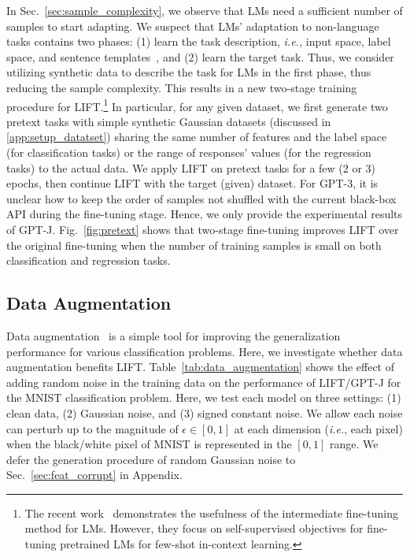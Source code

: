 In Sec.~\ref{sec:sample_complexity}, we observe that LMs need a sufficient number of samples to start adapting. We suspect that LMs' adaptation to non-language tasks contains two phases: (1) learn the task description, \textit{i.e.,} input space, label space, and sentence templates~\citep{reynolds2021prompt,min2022rethinking}, and (2) learn the target task. Thus, we consider utilizing synthetic data to describe the task for LMs in the first phase, thus reducing the sample complexity. This results in a new two-stage training procedure for \textsc{LIFT}.\footnote{The recent work~\citep{chen2022improving} demonstrates the usefulness of the intermediate fine-tuning method for LMs. However, they focus on self-supervised objectives for fine-tuning pretrained LMs for few-shot in-context learning.} In particular, for any given dataset, we first generate two pretext tasks with simple synthetic Gaussian datasets (discussed in \ref{app:setup_datatset}) sharing the same number of features and the label space (for classification tasks) or the range of responses' values (for the regression tasks) to the actual data. We apply \textsc{LIFT} on pretext tasks for a few (2 or 3) epochs, then continue \textsc{LIFT} with the target (given) dataset. For GPT-3, it is unclear how to keep the order of samples not shuffled with the current black-box API during the fine-tuning stage. Hence, we only provide the experimental results of GPT-J.
Fig.~\ref{fig:pretext} shows that two-stage  fine-tuning improves \textsc{LIFT} over the original fine-tuning when the number of training samples is small on both classification and regression tasks. 

\subsection{Data Augmentation}
\label{sec:improve_augmentation}

Data augmentation~\citep{shorten2019survey} is a simple tool for improving the generalization performance for various classification problems. Here, we investigate whether data augmentation benefits \textsc{LIFT}. Table~\ref{tab:data_augmentation} shows the effect of adding random noise in the training data on the performance of \textsc{LIFT}/GPT-J for the MNIST classification problem. Here, we test each model on three settings: (1) clean data, (2) Gaussian noise, and (3) signed constant noise. We allow each noise can perturb up to the magnitude of ${\epsilon} \in [0,1]$ at each dimension (\textit{i.e.}, each pixel) when the black/white pixel of MNIST is represented in the $[0,1]$ range. We defer the generation procedure of random Gaussian noise to Sec.~\ref{sec:feat_corrupt} in Appendix.

